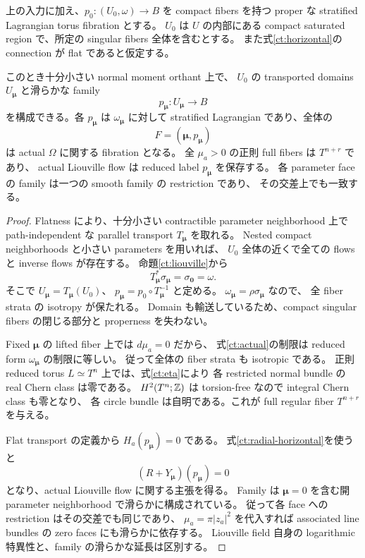 \begin{theorem}
\label{ct:coherent-family}
上の入力に加え、$p_0:(U_0,\omega)\to B$ を compact fibers を持つ proper な
stratified Lagrangian torus fibration とする。
$U_0$ は $U$ の内部にある compact saturated region で、所定の singular fibers 全体を含むとする。
また式\eqref{ct:horizontal}の connection が flat であると仮定する。

このとき十分小さい normal moment orthant 上で、
$U_0$ の transported domains $U_{\boldsymbol\mu}$ と滑らかな family
\[
 p_{\boldsymbol\mu}:U_{\boldsymbol\mu}\longrightarrow B
\]
を構成できる。各 $p_{\boldsymbol\mu}$ は $\omega_{\boldsymbol\mu}$ に対して
stratified Lagrangian であり、全体の
\[
 F=(\boldsymbol\mu,p_{\boldsymbol\mu})
\]
は actual $\Omega$ に関する fibration となる。
全 $\mu_a>0$ の正則 full fibers は $T^{n+r}$ であり、
actual Liouville flow は reduced label $p_{\boldsymbol\mu}$ を保存する。
各 parameter face の family は一つの smooth family の restriction であり、
その交差上でも一致する。
\end{theorem}

\begin{proof}
Flatness により、十分小さい contractible parameter neighborhood 上で
path-independent な parallel transport $T_{\boldsymbol\mu}$ を取れる。
Nested compact neighborhoods と小さい parameters を用いれば、
$U_0$ 全体の近くで全ての flows と inverse flows が存在する。
命題\ref{ct:liouville}から
\[
 T_{\boldsymbol\mu}^*\sigma_{\boldsymbol\mu}=\sigma_{\boldsymbol0}=\omega.
\]
そこで $U_{\boldsymbol\mu}=T_{\boldsymbol\mu}(U_0)$、
$p_{\boldsymbol\mu}=p_0\circ T_{\boldsymbol\mu}^{-1}$ と定める。
$\omega_{\boldsymbol\mu}=\rho\sigma_{\boldsymbol\mu}$ なので、
全 fiber strata の isotropy が保たれる。
Domain も輸送しているため、compact singular fibers の閉じる部分と properness を失わない。

Fixed $\boldsymbol\mu$ の lifted fiber 上では $d\mu_a=0$ だから、
式\eqref{ct:actual}の制限は reduced form $\omega_{\boldsymbol\mu}$ の制限に等しい。
従って全体の fiber strata も isotropic である。
正則 reduced torus $L\simeq T^n$ 上では、式\eqref{ct:eta}により
各 restricted normal bundle の real Chern class は零である。
$H^2(T^n;\mathbb Z)$ は torsion-free なので integral Chern class も零となり、
各 circle bundle は自明である。これが full regular fiber $T^{n+r}$ を与える。

Flat transport の定義から $H_a(p_{\boldsymbol\mu})=0$ である。
式\eqref{ct:radial-horizontal}を使うと
\[
 (R+Y_{\boldsymbol\mu})(p_{\boldsymbol\mu})=0
\]
となり、actual Liouville flow に関する主張を得る。
Family は $\boldsymbol\mu=0$ を含む開 parameter neighborhood で滑らかに構成されている。
従って各 face への restriction はその交差でも同じであり、
$\mu_a=\pi|z_a|^2$ を代入すれば associated line bundles の zero faces にも滑らかに依存する。
Liouville field 自身の logarithmic 特異性と、family の滑らかな延長は区別する。
\end{proof}

